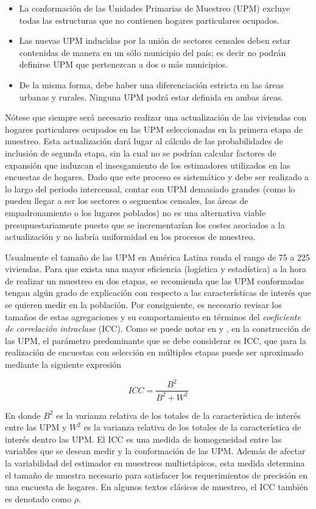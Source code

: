 \documentclass[
  12pt,
  spanish,
]{book}
\providecommand{\tightlist}{%
  \setlength{\itemsep}{0pt}\setlength{\parskip}{0pt}}
\begin{document}
\begin{itemize}
\tightlist
\item
  La conformación de las Unidades Primarias de Muestreo (UPM) excluye todas las estructuras que no contienen hogares particulares ocupados.
\item
  Las nuevas UPM inducidas por la unión de sectores censales deben estar contenidas de manera en un sólo municipio del país; es decir no podrán definirse UPM que pertenezcan a dos o más municipios.
\item
  De la misma forma, debe haber una diferenciación estricta en las áreas urbanas y rurales. Ninguna UPM podrá estar definida en ambas áreas.
\end{itemize}

Nótese que siempre será necesario realizar una actualización de las viviendas con hogares particulares ocupados en las UPM seleccionadas en la primera etapa de muestreo. Esta actualización dará lugar al cálculo de las probabilidades de inclusión de segunda etapa, sin la cual no se podrían calcular factores de expansión que induzcan el insesgamiento de los estimadores utilizados en las encuestas de hogares. Dado que este proceso es sistemático y debe ser realizado a lo largo del periodo intercensal, contar con UPM demasiado grandes (como lo pueden llegar a ser los sectores o segmentos censales, las áreas de empadronamiento o los lugares poblados) no es una alternativa viable presupuestariamente puesto que se incrementarían los costes asociados a la actualización y no habría uniformidad en los procesos de muestreo.

Usualmente el tamaño de las UPM en América Latina ronda el rango de 75 a 225 viviendas. Para que exista una mayor eficiencia (logística y estadística) a la hora de realizar un muestreo en dos etapas, se recomienda que las UPM conformadas tengan algún grado de explicación con respecto a las características de interés que se quieren medir en la población. Por consiguiente, es necesario revisar los tamaños de estas agregaciones y su comportamiento en términos del \emph{coeficiente de correlación intraclase} (ICC). Como se puede notar en \citet{Cochran_1977} y \citet{Gutierrez_2016}, en la construcción de las UPM, el parámetro predominante que se debe considerar es ICC, que para la realización de encuestas con selección en múltiples etapas puede ser aproximado mediante la siguiente expresión \citep{Valliant_Dever_Kreuter_2013}

\[
ICC = \frac{B^2}{B^2+W^2}
\]

En donde \(B^2\) es la varianza relativa de los totales de la característica de interés entre las UPM y \(W^2\) es la varianza relativa de los totales de la característica de interés dentro las UPM. El ICC es una medida de homogeneidad entre las variables que se desean medir y la conformación de las UPM. Además de afectar la variabilidad del estimador en muestreos multietápicos, esta medida determina el tamaño de muestra necesario para satisfacer los requerimientos de precisión en una encuesta de hogares. En algunos textos clásicos de muestreo, el ICC también es denotado como \(\rho\).
\end{document}
